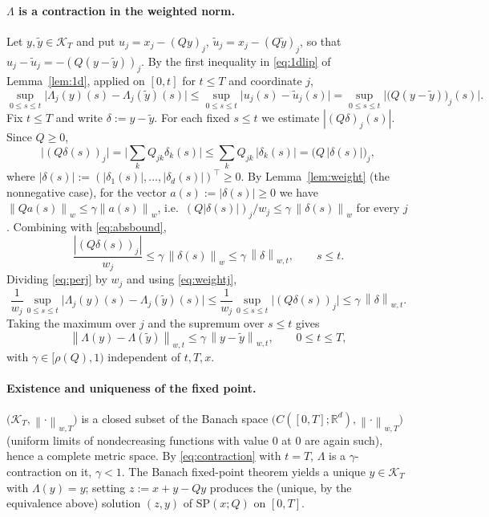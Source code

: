 \documentclass{amsart}
\theoremstyle{definition}
\theoremstyle{remark}
\newcommand{\R}{\mathbb{R}}
\newcommand{\norm}[1]{\left\lVert#1\right\rVert}
\begin{document}
\paragraph{$\Lambda$ is a contraction in the weighted norm.}
Let $y,\tilde y\in\mathcal K_T$ and put $u_j=x_j-(Qy)_j$,
$\tilde u_j=x_j-(Q\tilde y)_j$, so that
$u_j-\tilde u_j=-(Q(y-\tilde y))_j$. By the first inequality in
\eqref{eq:1dlip} of Lemma~\ref{lem:1d}, applied on $[0,t]$ for $t\le T$ and
coordinate $j$,
\begin{equation}\label{eq:perj}
  \sup_{0\le s\le t}\big|\Lambda_j(y)(s)-\Lambda_j(\tilde y)(s)\big|
  \le \sup_{0\le s\le t}\big|u_j(s)-\tilde u_j(s)\big|
  = \sup_{0\le s\le t}\big|\big(Q(y-\tilde y)\big)_j(s)\big|.
\end{equation}
Fix $t\le T$ and write $\delta:=y-\tilde y$. For each fixed $s\le t$ we estimate
$|(Q\delta)_j(s)|$. Since $Q\ge0$,
\begin{equation}\label{eq:absbound}
  \big|(Q\delta(s))_j\big|=\Big|\sum_k Q_{jk}\delta_k(s)\Big|
  \le \sum_k Q_{jk}\,|\delta_k(s)|=\big(Q\,|\delta(s)|\big)_j ,
\end{equation}
where $|\delta(s)|:=(|\delta_1(s)|,\dots,|\delta_d(s)|)^\top\ge0$. By
Lemma~\ref{lem:weight} (the nonnegative case), for the vector
$a(s):=|\delta(s)|\ge0$ we have
$\norm{Q a(s)}_w\le\gamma\norm{a(s)}_w$, i.e.\
$(Q|\delta(s)|)_j/w_j\le\gamma\,\norm{\delta(s)}_w$ for every $j$. Combining
with \eqref{eq:absbound},
\begin{equation}\label{eq:weightj}
  \frac{|(Q\delta(s))_j|}{w_j}\le\gamma\,\norm{\delta(s)}_w
  \le\gamma\,\norm{\delta}_{w,t},\qquad s\le t .
\end{equation}
Dividing \eqref{eq:perj} by $w_j$ and using \eqref{eq:weightj},
\[
  \frac1{w_j}\sup_{0\le s\le t}\big|\Lambda_j(y)(s)-\Lambda_j(\tilde y)(s)\big|
  \le \frac1{w_j}\sup_{0\le s\le t}\big|(Q\delta(s))_j\big|
  \le \gamma\,\norm{\delta}_{w,t}.
\]
Taking the maximum over $j$ and the supremum over $s\le t$ gives
\begin{equation}\label{eq:contraction}
  \norm{\Lambda(y)-\Lambda(\tilde y)}_{w,t}\le\gamma\,\norm{y-\tilde y}_{w,t},
  \qquad 0\le t\le T,
\end{equation}
with $\gamma\in[\rho(Q),1)$ independent of $t,T,x$.

\paragraph{Existence and uniqueness of the fixed point.}
$\big(\mathcal K_T,\norm{\cdot}_{w,T}\big)$ is a closed subset of the Banach
space $\big(C([0,T];\R^d),\norm{\cdot}_{w,T}\big)$ (uniform limits of
nondecreasing functions with value $0$ at $0$ are again such), hence a complete
metric space. By \eqref{eq:contraction} with $t=T$, $\Lambda$ is a
$\gamma$-contraction on it, $\gamma<1$. The Banach fixed-point theorem yields a
unique $y\in\mathcal K_T$ with $\Lambda(y)=y$; setting $z:=x+y-Qy$ produces the
(unique, by the equivalence above) solution $(z,y)$ of $\mathrm{SP}(x;Q)$ on
$[0,T]$.
\end{document}
